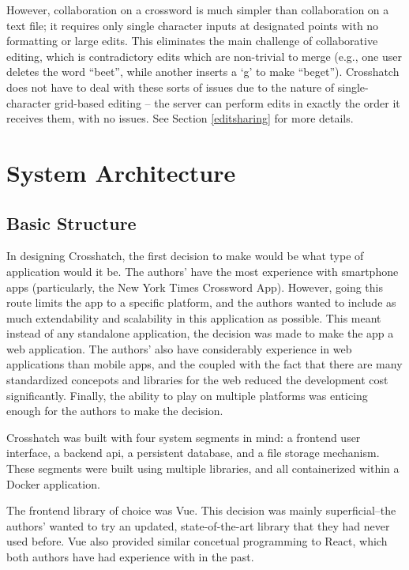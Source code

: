 \documentclass{article}
\begin{document}
However, collaboration on a crossword is much simpler than collaboration on a text file; it requires only
single character inputs at designated points with no formatting or large edits. This eliminates the main challenge of collaborative editing,
which is contradictory edits which are non-trivial to merge (e.g., one user deletes the word ``beet'', while another inserts a `g' to make ``beget'').
Crosshatch does not have to deal with these sorts of issues due to the nature of single-character grid-based editing -- the server can perform edits in
exactly the order it receives them, with no issues. See Section \ref{editsharing} for more details.

\section{System Architecture}
\subsection{Basic Structure}

In designing Crosshatch, the first decision to make would be what type of application would it be. The authors' have the most
experience with smartphone apps (particularly, the New York Times Crossword App). However, going this route limits the app to a
specific platform, and the authors wanted to include as much extendability and scalability in this application as possible. This meant instead
of any standalone application, the decision was made to make the app a web application. The authors' also have considerably experience in web applications
than mobile apps, and the coupled with the fact that there are many standardized concepots and libraries for the web reduced the development cost significantly.
Finally, the ability to play on multiple platforms was enticing enough for the authors to make the decision.

Crosshatch was built with four system segments in mind: a frontend user interface, a backend api, a persistent database, 
and a file storage mechanism. These segments were built using multiple libraries, and all containerized within a Docker application.

The frontend library of choice was Vue. This decision was mainly superficial--the authors' wanted to try an updated, state-of-the-art library
that they had never used before. Vue also provided similar concetual programming to React, which both authors have had experience with in the past.
\end{document}
